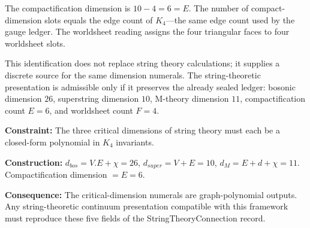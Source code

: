 \documentclass[11pt,a4paper]{book}
\def\cdot{.}%
\def\mathrm#1{#1}%
\def\texttt#1{#1}%
\newcommand{\VoidRef}[2]{\textit{#2} (in \textit{Void})}
\begin{document}
The compactification dimension is $10 - 4 = 6 = E$. The number of compact-dimension slots equals the edge count of $K_4$---the same edge count used by the gauge ledger. The worldsheet reading assigns the four triangular faces to four worldsheet slots.

This identification does not replace string theory calculations; it supplies a discrete source for the same dimension numerals. The string-theoretic presentation is admissible only if it preserves the already sealed ledger: bosonic dimension $26$, superstring dimension $10$, M-theory dimension $11$, compactification count $E = 6$, and worldsheet count $F = 4$.


\textbf{Constraint:} The three critical dimensions of string theory must each be a closed-form polynomial in $K_4$ invariants.

\textbf{Construction:} $d_{\mathrm{bos}} = V \cdot E + \chi = 26$, $d_{\mathrm{super}} = V + E = 10$, $d_{\mathrm{M}} = E + d + \chi = 11$. Compactification dimension $= E = 6$.

\textbf{Consequence:} The critical-dimension numerals are graph-polynomial outputs. Any string-theoretic continuum presentation compatible with this framework must reproduce these five fields of the \texttt{StringTheoryConnection} record.
\end{document}
